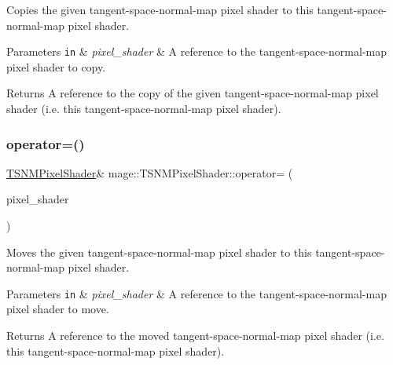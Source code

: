 Copies the given tangent-\/space-\/normal-\/map pixel shader to this tangent-\/space-\/normal-\/map pixel shader.


\begin{DoxyParams}[1]{Parameters}
\mbox{\tt in}  & {\em pixel\+\_\+shader} & A reference to the tangent-\/space-\/normal-\/map pixel shader to copy. \\
\hline
\end{DoxyParams}
\begin{DoxyReturn}{Returns}
A reference to the copy of the given tangent-\/space-\/normal-\/map pixel shader (i.\+e. this tangent-\/space-\/normal-\/map pixel shader). 
\end{DoxyReturn}
\hypertarget{classmage_1_1_t_s_n_m_pixel_shader_a0d714c73017f9bb9b273b2d2a276ab5f}{}\label{classmage_1_1_t_s_n_m_pixel_shader_a0d714c73017f9bb9b273b2d2a276ab5f} 
\subsubsection{\texorpdfstring{operator=()}{operator=()}\hspace{0.1cm}{\footnotesize\ttfamily [2/2]}}
{\footnotesize\ttfamily \hyperlink{classmage_1_1_t_s_n_m_pixel_shader}{T\+S\+N\+M\+Pixel\+Shader}\& mage\+::\+T\+S\+N\+M\+Pixel\+Shader\+::operator= (\begin{DoxyParamCaption}\item[{\hyperlink{classmage_1_1_t_s_n_m_pixel_shader}{T\+S\+N\+M\+Pixel\+Shader} \&\&}]{pixel\+\_\+shader }\end{DoxyParamCaption})\hspace{0.3cm}{\ttfamily [delete]}}

Moves the given tangent-\/space-\/normal-\/map pixel shader to this tangent-\/space-\/normal-\/map pixel shader.


\begin{DoxyParams}[1]{Parameters}
\mbox{\tt in}  & {\em pixel\+\_\+shader} & A reference to the tangent-\/space-\/normal-\/map pixel shader to move. \\
\hline
\end{DoxyParams}
\begin{DoxyReturn}{Returns}
A reference to the moved tangent-\/space-\/normal-\/map pixel shader (i.\+e. this tangent-\/space-\/normal-\/map pixel shader). 
\end{DoxyReturn}
\hypertarget{classmage_1_1_t_s_n_m_pixel_shader_abe01a4e6007a0a1ca98ed8fe48523138}{}\label{classmage_1_1_t_s_n_m_pixel_shader_abe01a4e6007a0a1ca98ed8fe48523138} 
